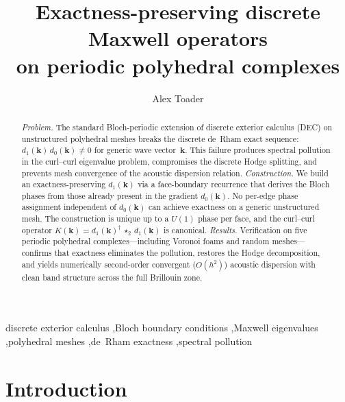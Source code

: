 \documentclass[preprint,12pt]{elsarticle}
\begin{document}
\begin{frontmatter}

\title{Exactness-preserving discrete Maxwell operators\\on periodic polyhedral complexes}

\author{Alex Toader}
\address{Independent researcher}

\begin{abstract}
\emph{Problem.}
The standard Bloch-periodic extension of discrete exterior calculus (DEC) on unstructured polyhedral meshes breaks the discrete de~Rham exact sequence: $d_1(\mathbf{k})\,d_0(\mathbf{k}) \neq 0$ for generic wave vector~$\mathbf{k}$. This failure produces spectral pollution in the curl--curl eigenvalue problem, compromises the discrete Hodge splitting, and prevents mesh convergence of the acoustic dispersion relation.
%
\emph{Construction.}
We build an exactness-preserving $d_1(\mathbf{k})$ via a face-boundary recurrence that derives the Bloch phases from those already present in the gradient $d_0(\mathbf{k})$. No per-edge phase assignment independent of $d_0(\mathbf{k})$ can achieve exactness on a generic unstructured mesh. The construction is unique up to a $U(1)$ phase per face, and the curl--curl operator $K(\mathbf{k}) = d_1(\mathbf{k})^\dagger\,\star_2\,d_1(\mathbf{k})$ is canonical.
%
\emph{Results.}
Verification on five periodic polyhedral complexes---including Voronoi foams and random meshes---confirms that exactness eliminates the pollution, restores the Hodge decomposition, and yields numerically second-order convergent ($O(h^2)$) acoustic dispersion with clean band structure across the full Brillouin zone.
\end{abstract}

\begin{keyword}
discrete exterior calculus \sep Bloch boundary conditions \sep Maxwell eigenvalues \sep polyhedral meshes \sep de~Rham exactness \sep spectral pollution
\end{keyword}

\end{frontmatter}

\section{Introduction}
\label{sec:intro}
\end{document}
